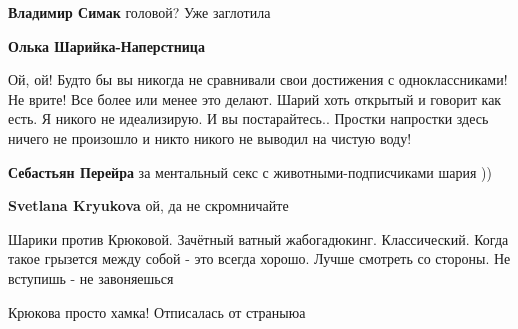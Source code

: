\begin{itemize}
\begin{itemize}
\textbf{Владимир Симак} головой? Уже заглотила

 
\textbf{Олька Шарийка-Наперстница} 

Ой, ой! Будто бы вы никогда не сравнивали свои достижения с одноклассниками! Не
врите! Все более или менее это делают. Шарий хоть открытый и говорит как есть.
Я никого не идеализирую. И вы постарайтесь.. Простки напростки здесь ничего не
произошло и никто никого не выводил на чистую воду!

 
\textbf{Себастьян Перейра} за ментальный секс с животными-подписчиками шария ))

 
\textbf{Svetlana Kryukova} ой, да не скромничайте

 

\obeycr
Шарики против Крюковой.
Зачётный ватный жабогадюкинг.
Классический.
Когда такое грызется между собой - это всегда хорошо.
Лучше смотреть со стороны.
Не вступишь - не завоняешься \Smiley[1.0][yellow]
\restorecr

 
Крюкова просто хамка! Отписалась от страныюа

 

\end{itemize}
\end{itemize}
